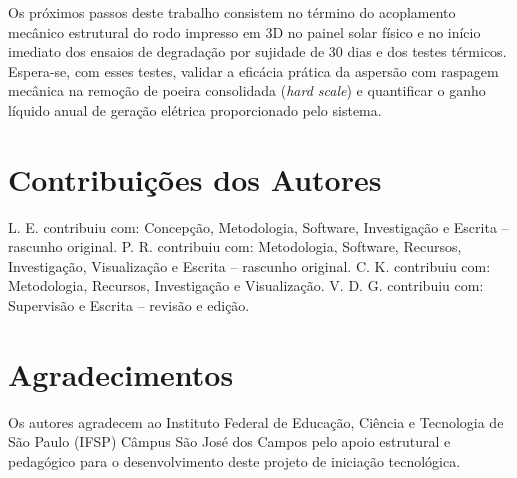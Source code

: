 \documentclass[12pt, a4paper]{article}
\begin{document}
Os próximos passos deste trabalho consistem no término do acoplamento mecânico estrutural do rodo impresso em 3D no painel solar físico e no início imediato dos ensaios de degradação por sujidade de 30 dias e dos testes térmicos. Espera-se, com esses testes, validar a eficácia prática da aspersão com raspagem mecânica na remoção de poeira consolidada (\textit{hard scale}) e quantificar o ganho líquido anual de geração elétrica proporcionado pelo sistema.

\section*{Contribuições dos Autores}

L. E. contribuiu com: Concepção, Metodologia, Software, Investigação e Escrita – rascunho original. P. R. contribuiu com: Metodologia, Software, Recursos, Investigação, Visualização e Escrita – rascunho original. C. K. contribuiu com: Metodologia, Recursos, Investigação e Visualização. V. D. G. contribuiu com: Supervisão e Escrita – revisão e edição.

\section*{Agradecimentos}

Os autores agradecem ao Instituto Federal de Educação, Ciência e Tecnologia de São Paulo (IFSP) Câmpus São José dos Campos pelo apoio estrutural e pedagógico para o desenvolvimento deste projeto de iniciação tecnológica.



\end{document}
